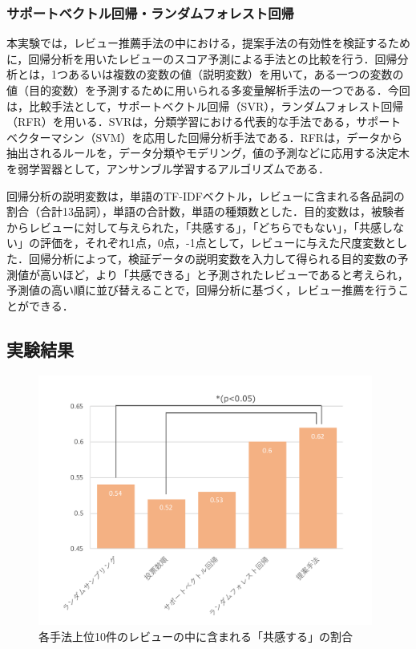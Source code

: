 \documentclass[a4paper,11pt,oneside,openany]{jsbook}
\begin{document}
\subsubsection{サポートベクトル回帰・ランダムフォレスト回帰}
本実験では，レビュー推薦手法の中における，提案手法の有効性を検証するために，回帰分析を用いたレビューのスコア予測による手法との比較を行う．回帰分析とは，1つあるいは複数の変数の値（説明変数）を用いて，ある一つの変数の値（目的変数）を予測するために用いられる多変量解析手法の一つである．今回は，比較手法として，サポートベクトル回帰（SVR），ランダムフォレスト回帰（RFR）を用いる．SVRは，分類学習における代表的な手法である，サポートベクターマシン（SVM）を応用した回帰分析手法である．RFRは，データから抽出されるルールを，データ分類やモデリング，値の予測などに応用する決定木を弱学習器として，アンサンブル学習するアルゴリズムである．
\par
回帰分析の説明変数は，単語のTF-IDFベクトル，レビューに含まれる各品詞の割合（合計13品詞），単語の合計数，単語の種類数とした．目的変数は，被験者からレビューに対して与えられた，「共感する」，「どちらでもない」，「共感しない」の評価を，それぞれ1点，0点，-1点として，レビューに与えた尺度変数とした．回帰分析によって，検証データの説明変数を入力して得られる目的変数の予測値が高いほど，より「共感できる」と予測されたレビューであると考えられ，予測値の高い順に並び替えることで，回帰分析に基づく，レビュー推薦を行うことができる．

		\subsection{実験結果}
\begin{figure}[tb]
	\begin{center} %
		\includegraphics [width = 110mm] {figures/review_result1.pdf} %
	\end{center}
	\caption{各手法上位10件のレビューの中に含まれる「共感する」の割合} %
	\label{fig:review_result1} %
\end{figure}
\end{document}
